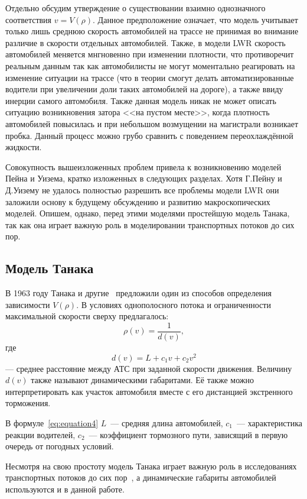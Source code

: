 Отдельно обсудим утверждение о существовании взаимно однозначного соответствия \(v=V(\rho)\).
Данное предположение означает, что модель учитывает только лишь среднюю скорость автомобилей на трассе не принимая во внимание различие в скорости отдельных автомобилей.
Также, в модели LWR скорость автомобилей меняется мнгновенно при изменении плотности, что противоречит реальным данным так как автомобилисты не могут моментально реагировать на изменение ситуации на трассе (что в теории смогут делать автоматизированные водители при увеличении доли таких автомобилей на дороге), а также ввиду инерции самого автомобиля.
Также данная модель никак не может описать ситуацию возникновения затора <<на пустом месте>>, когда плотность автомобилей повысилась и при небольшом возмущении на магистрали возникает пробка.
Данный процесс можно грубо сравнить с поведением переохлаждённой жидкости.

Совокупность вышеизложенных проблем привела к возникновению моделей Пейна и Уизема, кратко изложенных в следующих разделах.
Хотя Г.Пейну и Д.Уизему не удалось полностью разрешить все проблемы модели LWR они заложили основу к будущему обсуждению и развитию макроскопических моделей.
Опишем, однако, перед этими моделями простейшую модель Танака, так как она играет важную роль в моделировании транспортных потоков до сих пор.

\subsection{Модель Танака}\label{subsec:ch1/sec1/sub2}
В 1963 году Танака и другие~\cite{inose1983control} предложили один из способов определения зависимости \( V(\rho) \).
В условиях однополосного потока и ограниченности максимальной скорости сверху предлагалось:
\[
\rho(v) = \frac{1}{d(v)},
\]
где
\begin{equation}
    \label{eq:equation4}
    d(v) = L + c_1v + c_2v^2
\end{equation}
--- среднее расстояние между АТС при заданной скорости движения.
Величину $d(v)$ также называют динамическими габаритами.
Её также можно интерпретировать как участок автомобиля вместе с его дистанцией экстренного торможения.

В формуле~\cref{eq:equation4} \(L\)~--- средняя длина автомобилей, \(c_1\)~--- характеристика реакции водителей, \(c_2\)~--- коэффициент тормозного пути, зависящий в первую очередь от погодных условий.

Несмотря на свою простоту модель Танака играет важную роль в исследованиях транспортных потоков до сих пор~\cite{gartner2002traffic}, а динамические габариты автомобилей используются и в данной работе.

